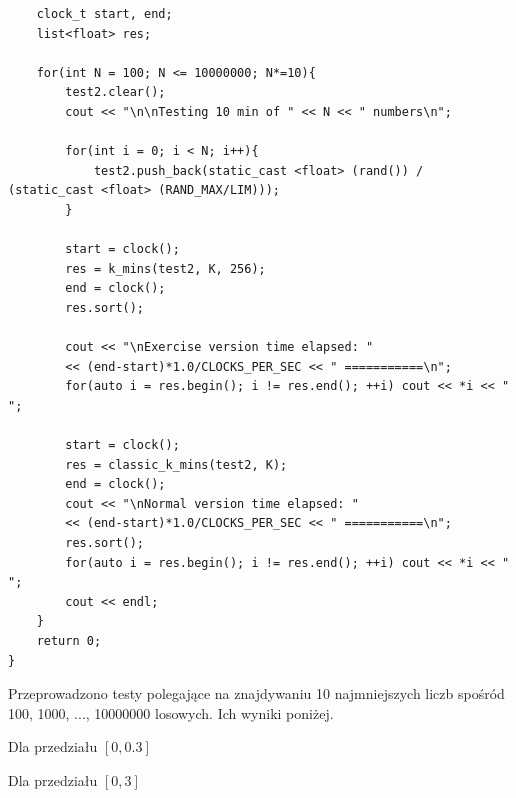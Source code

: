 \documentclass{article}
\begin{document}
\begin{verbatim}
	clock_t start, end;
	list<float> res;

	for(int N = 100; N <= 10000000; N*=10){
		test2.clear();
		cout << "\n\nTesting 10 min of " << N << " numbers\n";

		for(int i = 0; i < N; i++){
			test2.push_back(static_cast <float> (rand()) / (static_cast <float> (RAND_MAX/LIM)));
		}

		start = clock();
		res = k_mins(test2, K, 256);
		end = clock();
		res.sort();

		cout << "\nExercise version time elapsed: " 
		<< (end-start)*1.0/CLOCKS_PER_SEC << " ===========\n";
		for(auto i = res.begin(); i != res.end(); ++i) cout << *i << " ";

		start = clock();
		res = classic_k_mins(test2, K);
		end = clock();
		cout << "\nNormal version time elapsed: " 
		<< (end-start)*1.0/CLOCKS_PER_SEC << " ===========\n";
		res.sort();
		for(auto i = res.begin(); i != res.end(); ++i) cout << *i << " ";
		cout << endl;
	}
	return 0;
}
\end{verbatim}

Przeprowadzono testy polegające na znajdywaniu 10 najmniejszych liczb spośród 100, 1000, ..., 10000000 losowych.
Ich wyniki poniżej.

Dla przedziału $[0, 0.3]$



Dla przedziału $[0, 3]$

\end{document}
